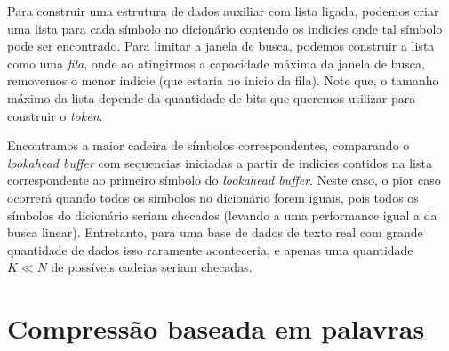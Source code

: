 Para construir uma estrutura de dados auxiliar com lista ligada, podemos criar uma lista para cada símbolo no dicionário contendo os indicies onde tal símbolo pode ser encontrado.  
Para limitar a janela de busca, podemos construir a lista como uma \emph{fila}, onde ao atingirmos a capacidade máxima da janela de busca, removemos o menor indicie (que estaria no inicio da fila). Note que, o tamanho máximo da lista depende da quantidade de bits que queremos utilizar para construir o \emph{token}.

Encontramos a maior cadeira de símbolos correspondentes, comparando o \emph{lookahead buffer} com sequencias iniciadas a partir de indicies contidos na lista correspondente ao primeiro símbolo do \emph{lookahead buffer}.
Neste caso, o pior caso ocorrerá quando todos os símbolos no dicionário forem iguais, pois todos os símbolos do dicionário seriam checados (levando a uma performance igual a da busca linear).
Entretanto, para uma base de dados de texto real com grande quantidade de dados isso raramente aconteceria, e apenas uma quantidade $K \ll N$ de possíveis cadeias seriam checadas.

\section{Compressão baseada em palavras}




